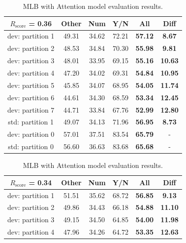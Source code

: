 \documentclass[letterpaper]{article}
\newcommand{\rscore}{}\def\rscore/{$R_{\text{score}}$}
\begin{document}
\begin{table}
\begin{subtable}{0.49\linewidth}
		\begin{adjustbox}{width=0.46\columnwidth}
\begin{tabular}{c | c c c c | c}
			\rscore/ = 0.36  & Other & Num   & Y/N   & All            & Diff           \\ [0.5ex]
			\hline
			dev: partition 1 & 49.31 & 34.62 & 72.21 & \textbf{57.12} & \textbf{8.67}  \\
			dev: partition 2 & 48.53 & 34.84 & 70.30 & \textbf{55.98} & \textbf{9.81}  \\
			dev: partition 3 & 48.01 & 33.95 & 69.15 & \textbf{55.16} & \textbf{10.63} \\
			dev: partition 4 & 47.20 & 34.02 & 69.31 & \textbf{54.84} & \textbf{10.95} \\
			dev: partition 5 & 45.85 & 34.07 & 68.95 & \textbf{54.05} & \textbf{11.74} \\
			dev: partition 6 & 44.61 & 34.30 & 68.59 & \textbf{53.34} & \textbf{12.45} \\
			dev: partition 7 & 44.71 & 33.84 & 67.76 & \textbf{52.99} & \textbf{12.80} \\
			\hline
			std: partition 1 & 49.07 & 34.13 & 71.96 & \textbf{56.95} & \textbf{8.73}  \\
			\hline
			dev: partition 0 & 57.01 & 37.51 & 83.54 & \textbf{65.79} & -              \\
			std: partition 0 & 56.60 & 36.63 & 83.68 & \textbf{65.68} & -              \\
			\hline
		\end{tabular}
\end{adjustbox}
		\caption{MLB with Attention model evaluation results.}
	\end{subtable}
	\begin{subtable}{0.49\linewidth}
		\begin{adjustbox}{width=0.46\columnwidth}
\begin{tabular}{c | c c c c | c}
			\rscore/ = 0.34  & Other & Num   & Y/N   & All            & Diff           \\ [0.5ex]
			\hline
			dev: partition 1 & 51.51 & 35.62 & 68.72 & \textbf{56.85} & \textbf{9.13}  \\
			dev: partition 2 & 49.86 & 34.43 & 66.18 & \textbf{54.88} & \textbf{11.10} \\
			dev: partition 3 & 49.15 & 34.50 & 64.85 & \textbf{54.00} & \textbf{11.98} \\
			dev: partition 4 & 47.96 & 34.26 & 64.72 & \textbf{53.35} & \textbf{12.63} \\

\end{tabular}
\end{adjustbox}
\end{subtable}
\end{table}
\end{document}
